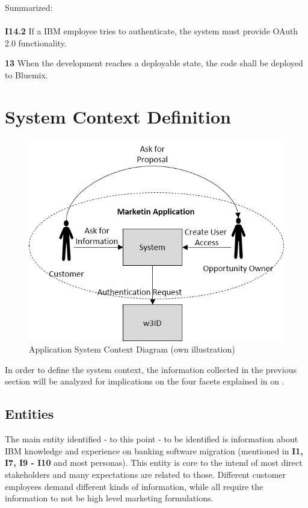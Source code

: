 Summarized: 

\paragraph{}
\begin{closeItem}
\item [\textbf{I14.2}] If a IBM employee tries to authenticate, the system must provide OAuth 2.0 functionality. 
\item[\textbf{13}] When the development reaches a deployable state, the code shall be deployed to Bluemix.
\end{closeItem}
\section{System Context Definition}

\begin{figure}
    \centering
    \includegraphics[width=\textwidth]{img/diagrams/Context.png}
    \caption[Application System Context Diagram]{Application System Context Diagram (own illustration)}
    \label{fig:my_label}
\end{figure}

In order to define the system context, the information collected in the previous section will be analyzed for implications on the four facets explained in  on .

\subsection{Entities}
The main entity identified - to this point - to be identified is information about IBM knowledge and experience on banking software migration (mentioned in \textbf{I1, I7, I9 - I10} and most personas). This entity is core to the intend of most direct stakeholders and many expectations are related to those. Different customer employees demand different kinds of information, while all require the information to not be high level marketing formulations.

